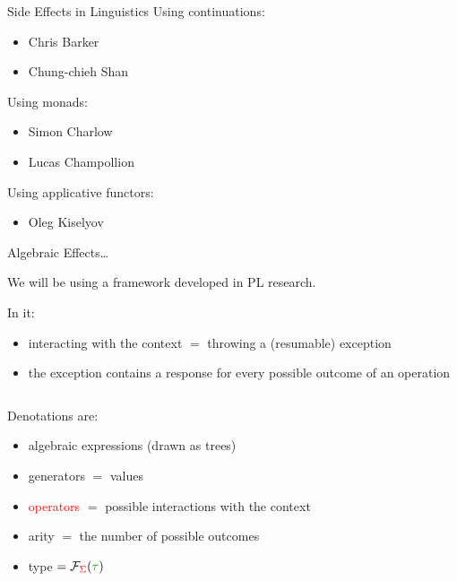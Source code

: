 \documentclass{beamer}
\newcommand{\includepicturescale}[2]{
    \texttt{[image: dias/\#1.eps]}
}
\begin{document}
\begin{frame}{Side Effects in Linguistics}
  Using continuations:
  \begin{itemize}
  \item Chris Barker
  \item Chung-chieh Shan
  \end{itemize}
  \vfill
  \pause
  Using monads:
  \begin{itemize}
  \item Simon Charlow
  \item Lucas Champollion
  \end{itemize}
  \vfill
  \pause
  Using applicative functors:
  \begin{itemize}
  \item Oleg Kiselyov
  \end{itemize}
\end{frame}


\begin{frame}{Algebraic Effects\ldots}

  We will be using a framework developed in PL research.

  \vfill
  
  In it:
  \begin{itemize}
  \item interacting with the context $=$ throwing a (resumable) exception
  \item the exception contains a response for every possible outcome of an
    operation
  \end{itemize}
 
  \pause
  \vfill
  
  \begin{columns}
    \begin{column}{0.5\textwidth}
   Denotations are:
  \begin{itemize}
  \item algebraic expressions (drawn as trees)
  \item \textcolor{mygreen}{generators} $=$ values
  \item \textcolor{red}{operators} $=$ possible interactions with the context
  \item arity $=$ the number of possible outcomes
  \item type $= \mathcal{F}_{\textcolor{red}{\Sigma}}(\textcolor{mygreen}{\tau})$
  \end{itemize}
    \end{column}
    \begin{column}{0.5\textwidth}
      \only<2>{\includepicturescale{example}{0.4}}
    \end{column}
  \end{columns}
\end{frame}
\end{document}
